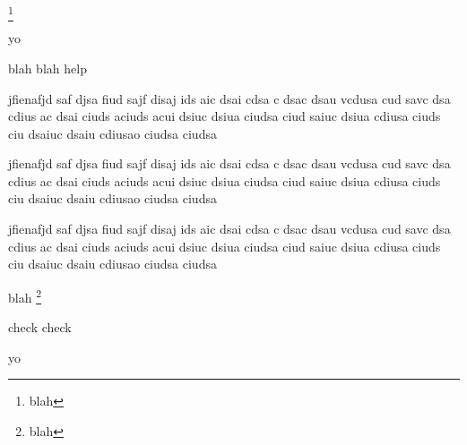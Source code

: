 



\usepackage{lipsum}






 \footnote{blah}

\begin{noteblock}{yo}
\lipsum[1]
\end{noteblock}

\begin{noteblock}{blah blah}
help
\end{noteblock}

\noindent jfienafjd saf djsa fiud sajf disaj ids aic dsai cdsa c dsac dsau vcdusa cud savc dsa cdius ac dsai ciuds aciuds acui dsiuc dsiua ciudsa ciud saiuc dsiua cdiusa ciuds ciu dsaiuc dsaiu cdiusao ciudsa ciudsa

jfienafjd saf djsa fiud sajf disaj ids aic dsai cdsa c dsac dsau vcdusa cud savc dsa cdius ac dsai ciuds aciuds acui dsiuc dsiua ciudsa ciud saiuc dsiua cdiusa ciuds ciu dsaiuc dsaiu cdiusao ciudsa ciudsa

\noindent \begin{minipage}{\textwidth}
jfienafjd saf djsa fiud sajf disaj ids aic dsai cdsa c dsac dsau vcdusa cud savc dsa cdius ac dsai ciuds aciuds acui dsiuc dsiua ciudsa ciud saiuc dsiua cdiusa ciuds ciu dsaiuc dsaiu cdiusao ciudsa ciudsa
\end{minipage}

\newpage

blah \footnote{blah}

\begin{noteblock}{check}
check
\end{noteblock}

\lipsum[2]

\begin{noteblock}{yo}
\lipsum[1]
\end{noteblock}



